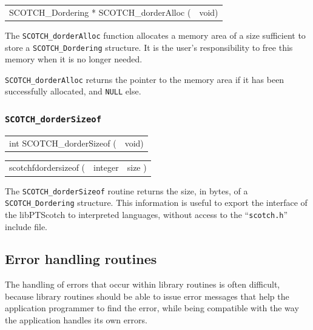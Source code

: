 \begin{itemize}
\progsyn

{\tt\begin{tabular}{l@{}l}
SCOTCH\_Dordering * SCOTCH\_dorderAlloc ( & void)
\end{tabular}}

\progdes

The {\tt SCOTCH\_dorderAlloc} function allocates a memory area of a
size sufficient to store a {\tt SCOTCH\_\lbt Dordering} structure. It is
the user's responsibility to free this memory when it is no longer
needed.

\progret

{\tt SCOTCH\_dorderAlloc} returns the pointer to the memory area if it
has been successfully allocated, and {\tt NULL} else.
\end{itemize}

\subsubsection{{\tt SCOTCH\_dorderSizeof}}

\begin{itemize}
\progsyn

{\tt\begin{tabular}{l@{}l}
int SCOTCH\_dorderSizeof ( & void)
\end{tabular}}

{\tt\begin{tabular}{l@{}ll}
scotchfdordersizeof ( & integer & size )
\end{tabular}}

\progdes

The {\tt SCOTCH\_dorderSizeof} routine returns the size, in bytes, of a
{\tt SCOTCH\_\lbt Dordering} structure. This information is useful to
export the interface of the {\sc libPTScotch} to interpreted languages,
without access to the ``{\tt scotch.h}'' include file.
\end{itemize}

\subsection{Error handling routines}
\label{sec-lib-error}

The handling of errors that occur within library routines is
often difficult, because library routines should be able to issue
error messages that help the application programmer to find the
error, while being compatible with the way the application handles
its own errors.

